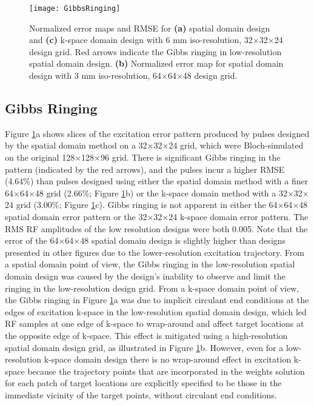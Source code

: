\begin{figure}
	\centering
	\texttt{[image: GibbsRinging]}
	\caption{Normalized error maps and RMSE for \textbf{(a)} spatial domain design and \textbf{(c)} k-space domain design with 6 mm iso-resolution, 32$\times$32$\times$24 design grid. Red arrows indicate the Gibbs ringing in low-resolution spatial domain design. \textbf{(b)} Normalized error map for spatial domain design with 3 mm iso-resolution, 64$\times$64$\times$48 design grid.}
	\label{fig:GibbsRing}
\end{figure}

\subsection*{Gibbs Ringing}
Figure \ref{fig:GibbsRing}a shows slices of the excitation error pattern produced by pulses designed by the spatial domain method
on a 32$\times$32$\times$24 grid, which were Bloch-simulated on the original 128$\times$128$\times$96 grid. 
There is significant Gibbs ringing in the pattern (indicated by the red arrows),
and the pulses incur a higher RMSE (4.64\%) than pulses designed using either the spatial domain method with a finer 64$\times$64$\times$48 grid
(2.66\%; Figure \ref{fig:GibbsRing}b) or the k-space domain method with a 32$\times$32$\times$24 grid (3.00\%; Figure \ref{fig:GibbsRing}c). 
Gibbs ringing is not apparent in either the 64$\times$64$\times$48 spatial domain error pattern or the 32$\times$32$\times$24 k-space domain error pattern. 
The RMS RF amplitudes of the low resolution designs were both 0.005. 
Note that the error of the 64$\times$64$\times$48 spatial domain design is slightly higher than designs presented in other figures
due to the lower-resolution excitation trajectory. 
From a spatial domain point of view, 
the Gibbs ringing in the low-resolution spatial domain design was caused by the design's inability to observe and limit the ringing in the low-resolution design grid. 
From a k-space domain point of view, the Gibbs ringing in 
Figure \ref{fig:GibbsRing}a was due to implicit circulant end conditions at the edges of excitation k-space in the low-resolution
spatial domain design,
which led RF samples at one edge of k-space to wrap-around and affect target locations at the opposite edge of k-space. 
This effect is mitigated using a high-resolution spatial domain design grid, as illustrated in Figure \ref{fig:GibbsRing}b. 
However, even for a low-resolution k-space domain design there is no wrap-around effect in excitation k-space 
because the trajectory points that are incorporated in the weights solution for each patch of target locations are explicitly specified to be those in the immediate vicinity of 
the target points, without circulant end conditions. 

